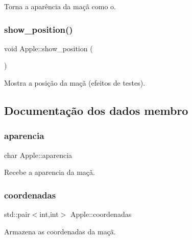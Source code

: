 Torna a aparência da maçã como o. 

\mbox{\label{classApple_af9794341f658031e4e98e5c25c796a34}} 
\subsubsection{\texorpdfstring{show\+\_\+position()}{show\_position()}}
{\footnotesize\ttfamily void Apple\+::show\+\_\+position (\begin{DoxyParamCaption}{ }\end{DoxyParamCaption})\hspace{0.3cm}{\ttfamily [inline]}}



Mostra a posição da maçã (efeitos de testes). 



\subsection{Documentação dos dados membro}
\mbox{\label{classApple_a30d63d92d655b11cf81309e4b4610465}} 
\subsubsection{\texorpdfstring{aparencia}{aparencia}}
{\footnotesize\ttfamily char Apple\+::aparencia\hspace{0.3cm}{\ttfamily [private]}}



Recebe a aparencia da maçã. 

\mbox{\label{classApple_ab2efb22edd843a549b29d5ba7ee40cc0}} 
\subsubsection{\texorpdfstring{coordenadas}{coordenadas}}
{\footnotesize\ttfamily std\+::pair$<$int,int$>$ Apple\+::coordenadas\hspace{0.3cm}{\ttfamily [private]}}



Armazena as coordenadas da maçã. 

